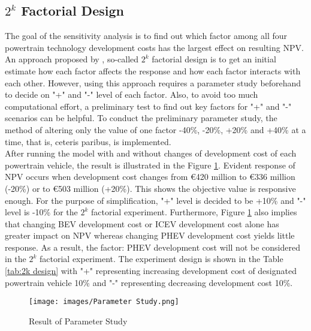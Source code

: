 \subsection{$2^k$ Factorial Design}\label{Design 1}
The goal of the sensitivity analysis is to find out which factor among all four powertrain technology development costs has the largest effect on resulting \gls{NPV}. An approach proposed by \cite{law2007simulation}, so-called $2^k$ factorial design is to get an initial estimate how each factor affects the response and how each factor interacts with each other. However, using this approach requires a parameter study beforehand to decide on "+" and "-" level of each factor. Also, to avoid too much computational effort, a preliminary test to find out key factors for "+" and "-" scenarios can be helpful. To conduct the preliminary parameter study, the method of altering only the value of one factor -40\%, -20\%, +20\% and +40\% at a time, that is, ceteris paribus, is implemented.\\
After running the model with and without changes of development cost of each powertrain vehicle, the result is illustrated in the Figure \ref{fig:ParameterStudy}. Evident response of \gls{NPV} occurs when development cost changes from \euro{420} million to \euro{336} million (-20\%) or to \euro{503} million (+20\%). This shows the objective value is responsive enough. For the purpose of simplification, "+" level is decided to be +10\% and "-" level is -10\% for the $2^k$ factorial experiment. Furthermore, Figure \ref{fig:ParameterStudy} also implies that changing \gls{BEV} development cost or \gls{ICEV} development cost alone has greater impact on \gls{NPV} whereas changing \gls{PHEV} development cost yields little response. As a result, the factor: \gls{PHEV} development cost will not be considered in the $2^k$ factorial experiment. The experiment design is shown in the Table \ref{tab:2k design} with "+" representing increasing development cost of designated powertrain vehicle 10\% and "-" representing decreasing development cost 10\%.
\begin{figure}[h!]
\begin{center}
\texttt{[image: images/Parameter Study.png]}
\caption{Result of Parameter Study}
\label{fig:ParameterStudy}
\end{center}
\end{figure}

